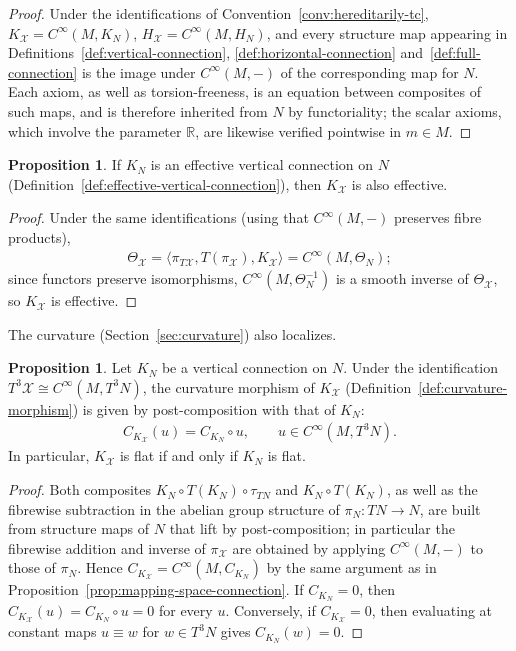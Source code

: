 \documentclass{amsart}
\newcommand{\R}{\mathbb{R}}
\newcommand{\X}{\mathcal{X}}
\theoremstyle{definition}
\newtheorem{prop}[thm]{Proposition}
\begin{document}
\begin{proof}
  Under the identifications of Convention~\ref{conv:hereditarily-tc}, $K_{\X} = C^\infty(M, K_N)$, $H_{\X} = C^\infty(M, H_N)$, and every structure map appearing in Definitions~\ref{def:vertical-connection}, \ref{def:horizontal-connection} and~\ref{def:full-connection} is the image under $C^\infty(M, -)$ of the corresponding map for $N$. 
  Each axiom, as well as torsion-freeness, is an equation between composites of such maps,
  and is therefore inherited from $N$ by functoriality; the scalar axioms, which involve the parameter $\R$, are likewise verified pointwise in $m \in M$.
\end{proof}

\begin{prop}\label{prop:mapping-space-effective}
   If $K_N$ is an effective vertical connection on $N$ (Definition~\ref{def:effective-vertical-connection}), then $K_{\X}$ is also effective.
\end{prop}

\begin{proof}
  Under the same identifications (using that $C^\infty(M, -)$ preserves
  fibre products),
  \begin{align*}
    \Theta_{\X} = \langle \pi_{T\X}, T(\pi_{\X}), K_{\X} \rangle
      = C^\infty(M, \Theta_N);
  \end{align*}
  since functors preserve isomorphisms,
  $C^\infty(M, \Theta_N^{-1})$ is a smooth inverse of $\Theta_{\X}$, so
  $K_{\X}$ is effective.
\end{proof}

The curvature (Section~\ref{sec:curvature}) also localizes.

\begin{prop}\label{prop:mapping-space-curvature}
  Let $K_N$ be a vertical connection on $N$. Under the identification $T^3\X \cong C^\infty(M, T^3N)$, the curvature morphism of $K_{\X}$ (Definition~\ref{def:curvature-morphism}) is given by post-composition with that of $K_N$:
  \begin{align*}
    C_{K_{\X}}(u) = C_{K_N} \circ u,
    \qquad u \in C^\infty(M, T^3N).
  \end{align*}
  In particular, $K_{\X}$ is flat if and only if $K_N$ is flat.
\end{prop}

\begin{proof}
  Both composites $K_N \circ T(K_N) \circ \tau_{TN}$ and $K_N \circ T(K_N)$, as well as the fibrewise subtraction in the abelian group structure of $\pi_N \colon TN \to N$, are built from structure maps of $N$ that lift by post-composition; in particular the fibrewise addition and inverse of $\pi_{\X}$ are obtained by applying
  $C^\infty(M, -)$ to those of $\pi_N$. 
  Hence $C_{K_{\X}} = C^\infty(M, C_{K_N})$ by the same argument as in Proposition~\ref{prop:mapping-space-connection}.
  If $C_{K_N} = 0$, then $C_{K_{\X}}(u) = C_{K_N} \circ u = 0$ for every $u$.
  Conversely, if $C_{K_{\X}} = 0$, then evaluating at constant maps $u \equiv w$ for $w \in T^3N$ gives $C_{K_N}(w) = 0$.
\end{proof}
\end{document}
